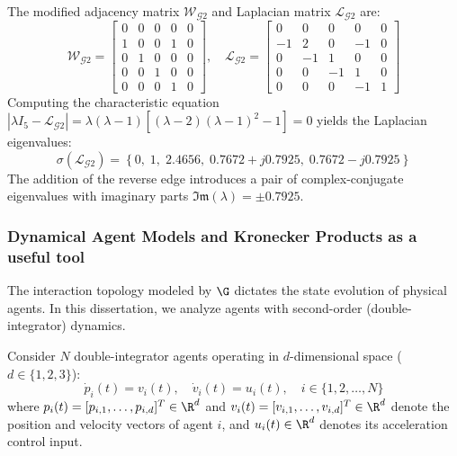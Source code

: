 \begin{example}
The modified adjacency matrix $\mathcal{W}_{\mathcal{G}2}$ and Laplacian matrix $\mathcal{L}_{\mathcal{G}2}$ are:
\begin{equation*}
\mathcal{W}_{\mathcal{G}2} = \begin{bmatrix} 
0 & 0 & 0 & 0 & 0 \\ 
1 & 0 & 0 & 1 & 0 \\ 
0 & 1 & 0 & 0 & 0 \\ 
0 & 0 & 1 & 0 & 0 \\ 
0 & 0 & 0 & 1 & 0 
\end{bmatrix}, \quad
\mathcal{L}_{\mathcal{G}2} = \begin{bmatrix} 
0 & 0 & 0 & 0 & 0 \\ 
-1 & 2 & 0 & -1 & 0 \\ 
0 & -1 & 1 & 0 & 0 \\ 
0 & 0 & -1 & 1 & 0 \\ 
0 & 0 & 0 & -1 & 1 
\end{bmatrix}
\end{equation*}
Computing the characteristic equation $|\lambda I_5 - \mathcal{L}_{\mathcal{G}2}| = \lambda (\lambda - 1) [(\lambda - 2)(\lambda - 1)^2 - 1] = 0$ yields the Laplacian eigenvalues:
\begin{equation*}
\sigma(\mathcal{L}_{\mathcal{G}2}) = \left\{ 0, \; 1, \; 2.4656, \; 0.7672 + j 0.7925, \; 0.7672 - j 0.7925 \right\}
\end{equation*}
The addition of the reverse edge introduces a pair of complex-conjugate eigenvalues with imaginary parts $\mathfrak{Im}(\lambda) = \pm 0.7925$.
\end{example}

\subsubsection{Dynamical Agent Models and Kronecker Products as a useful tool}
The interaction topology modeled by $\G$ dictates the state evolution of physical agents. In this dissertation, we analyze agents with second-order (double-integrator) dynamics.

Consider $N$ double-integrator agents operating in $d$-dimensional space ($d \in \{1, 2, 3\}$):
\begin{equation}\label{eq:double_integrator_model}
    \dot{p}_i(t) = v_i(t), \quad \dot{v}_i(t) = u_i(t), \quad i \in \{1, 2, \dots, N\}
\end{equation}
where $p_i(t) = [p_{i,1}, \dots, p_{i,d}]^T \in \R^d$ and $v_i(t) = [v_{i,1}, \dots, v_{i,d}]^T \in \R^d$ denote the position and velocity vectors of agent $i$, and $u_i(t) \in \R^d$ denotes its acceleration control input.


